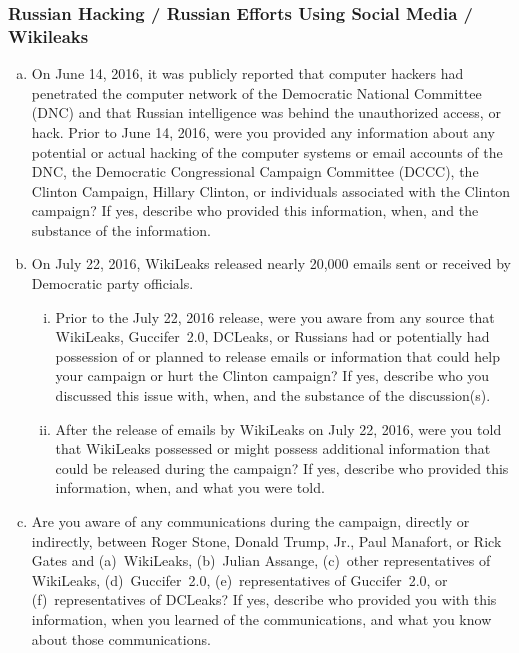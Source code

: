 \subsubsection{Russian Hacking / Russian Efforts Using Social Media / Wikileaks}

\begin{enumerate}[a.]

\item On June 14, 2016, it was publicly reported that computer hackers had penetrated the computer network of the Democratic National Committee (DNC) and that Russian intelligence was behind the unauthorized access, or hack.
Prior to June 14, 2016, were you provided any information about any potential or actual hacking of the computer systems or email accounts of the DNC, the Democratic Congressional Campaign Committee (DCCC), the Clinton Campaign, Hillary Clinton, or individuals associated with the Clinton campaign?
If yes, describe who provided this information, when, and the substance of the information.

\item On July 22, 2016, WikiLeaks released nearly 20,000 emails sent or received by Democratic party officials.

\begin{enumerate}[i.]

\item Prior to the July 22, 2016 release, were you aware from any source that WikiLeaks, Guccifer~2.0, DCLeaks, or Russians had or potentially had possession of or planned to release emails or information that could help your campaign or hurt the Clinton campaign?
If yes, describe who you discussed this issue with, when, and the substance of the discussion(s).

\item After the release of emails by WikiLeaks on July 22, 2016, were you told that WikiLeaks possessed or might possess additional information that could be released during the campaign?
If yes, describe who provided this information, when, and what you were told.

\end{enumerate}

\item Are you aware of any communications during the campaign, directly or indirectly, between Roger Stone, Donald Trump, Jr., Paul Manafort, or Rick Gates and (a)~WikiLeaks, (b)~Julian Assange, (c)~other representatives of WikiLeaks, (d)~Guccifer~2.0, (e)~representatives of Guccifer~2.0, or (f)~representatives of DCLeaks?
If yes, describe who provided you with this information, when you learned of the communications, and what you know about those communications.


\end{enumerate}
